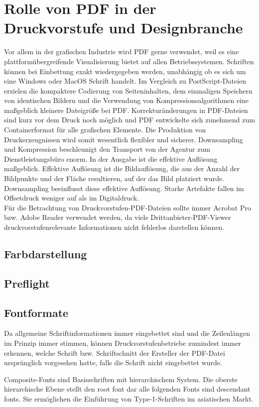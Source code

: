 \section{Rolle von PDF in der Druckvorstufe und Designbranche}
Vor allem in der grafischen Industrie wird PDF gerne verwendet, weil es eine plattformübergreifende Visualisierung bietet auf allen Betriebssystemen. Schriften können bei Einbettung exakt wiedergegeben werden, unabhängig ob es sich um eine Windows oder MacOS Schrift handelt. Im Vergleich zu PostScript-Dateien erzielen die kompaktere Codierung von Seiteninhalten, dem einmaligen Speichern von identischen Bildern und die Verwendung von Kompressionsalgorithmen eine maßgeblich kleinere Dateigröße bei PDF. Korrekturänderungen in PDF-Dateien sind kurz vor dem Druck noch möglich und PDF entwickelte sich zunehmend zum Containerformat für alle grafischen Elemente. Die Produktion von Druckerzeugnissen wird somit wesentlich flexibler und sicherer. Downsampling und Kompression beschleunigt den Transport von der Agentur zum Dienstleistungsbüro enorm. In der Ausgabe ist die effektive Auflösung maßgeblich. Effektive Auflösung ist die Bildauflösung, die aus der Anzahl der Bildpunkte und der Fläche resultieren, auf der das Bild platziert wurde. Downsampling beeinflusst diese effektive Auflösung. Starke Artefakte fallen im Offsetdruck weniger auf als im Digitaldruck. \\
Für die Betrachtung von Druckvorstufen-PDF-Dateien sollte immer Acrobat Pro bzw. Adobe Reader verwendet werden, da viele Drittanbieter-PDF-Viewer druckvorstufenrelevante Informationen nicht fehlerlos darstellen können. \cite{schneeberger}











\subsection{Farbdarstellung}



\subsection{Preflight}

\subsection{Fontformate}
Da allgemeine Schriftinformationen immer eingebettet sind und die Zeilenlängen im Prinzip immer stimmen, können Druckvorstufenbetriebe zumindest immer erkennen, welche Schrift bzw. Schriftschnitt der Ersteller der PDF-Datei ursprünglich vorgesehen hatte, falls die Schrift nicht eingebettet wurde. \cite{schneeberger}


Composite-Fonts sind Basisschriften mit hierarchischem System. Die oberste hierarchische Ebene stellt den root font dar alle folgenden Fonts sind descendant fonts. Sie ermöglichen die Einführung von Type-1-Schriften im asiatischen Markt. \cite{schneeberger}


